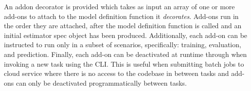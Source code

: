 \documentclass[../../fyp.tex]{subfiles}
\begin{document}
An addon decorator is provided which takes as input an array of one or more add-ons to attach to the model definition function it \textit{decorates}. Add-ons run in the order they are attached, after the model definition function is called and an initial estimator spec object has been produced. Additionally, each add-on can be instructed to run only in a subset of scenarios, specifically: training, evaluation, and prediction. Finally, each add-on can be deactivated at runtime through when invoking a new task using the CLI. This is useful when submitting batch jobs to cloud service where there is no access to the codebase in between tasks and add-ons can only be deactivated programmatically between tasks.
\end{document}
